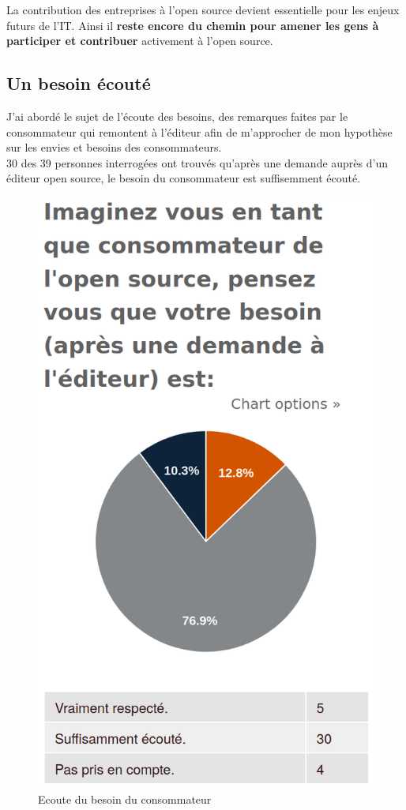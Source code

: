 			La contribution des entreprises à l'open source devient essentielle pour les enjeux futurs de l'IT. Ainsi il \textbf{reste encore du chemin pour amener les gens à participer et contribuer} activement à l'open source.

		\subsection{Un besoin écouté}

			J'ai abordé le sujet de l'écoute des besoins, des remarques faites par le consommateur qui remontent à l'éditeur afin de m'approcher de mon hypothèse sur les envies et besoins des consommateurs.\\

			30 des 39 personnes interrogées ont trouvés qu'après une demande auprès d'un éditeur open source, le besoin du consommateur est suffisemment écouté.

			\begin{figure}[!htb]
				\center
				\includegraphics[scale=0.28]{./img/ecoutebesoin}
				\caption{Ecoute du besoin du consommateur}
			\end{figure}

